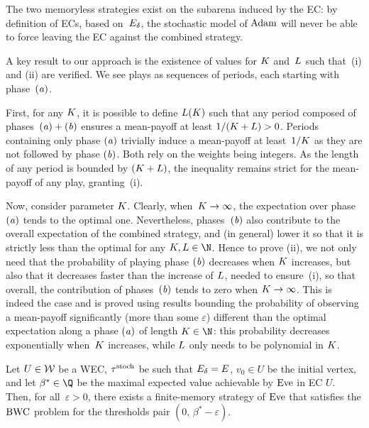 The two memoryless strategies exist on the subarena induced by the EC: by definition of ECs, based on~$E_{\delta}$, the stochastic model of $\text{Adam}$ will never be able to force leaving the EC against the combined strategy.

A key result to our approach is the existence of values for $K$ and~$L$ such that~(i) and (ii) are verified. We see plays as sequences of periods, each starting with phase~$\mathit{(a)}$.

First, for any $K$, it is possible to define $L(K)$ such that any period composed of phases~$\mathit{(a)}+\mathit{(b)}$ ensures a mean-payoff at least $1/(K+L) > 0$. Periods containing only phase $\mathit{(a)}$ trivially induce a mean-payoff at least~$1/K$ as they are not followed by phase $\mathit{(b)}$. Both rely on the weights being integers. As the length of any period is bounded by $(K+L)$, the inequality remains strict for the mean-payoff of any play, granting~(i).

Now, consider parameter $K$. Clearly, when~$K \rightarrow \infty$, the expectation over phase $\mathit{(a)}$ tends to the optimal one. Nevertheless, phases~$\mathit{(b)}$ also contribute to the overall expectation of the combined strategy, and (in general) lower it so that it is strictly less than the optimal for any $\stepsExp, \stepsWC \in \N$. Hence to prove (ii), we not only need that the probability of playing phase $\mathit{(b)}$ decreases when $K$ increases, but also that it decreases faster than the increase of $L$, needed to ensure~(i), so that overall, the contribution of phases~$\mathit{(b)}$ tends to zero when $K \rightarrow \infty$. This is indeed the case and is proved using results bounding the probability of observing a mean-payoff significantly (more than some $\varepsilon$) different than the optimal expectation along a phase $\mathit{(a)}$ of length $\stepsExp \in \N$: this probability decreases exponentially when~$K$ increases, while $L$ only needs to be polynomial in $K$.

\begin{theorem}
\label{12-thm:insideWinning}
Let $U \in \mathcal{W}$ be a WEC, $\tau^{\text{stoch}}$ be such that $E_{\delta} = E$, $v_0 \in U$ be the initial vertex, and let $\beta^\ast \in \Q$ be the maximal expected value achievable by $\text{Eve}$ in EC $U$. Then, for all~$\varepsilon > 0$, there exists a finite-memory strategy of $\text{Eve}$ that satisfies the $\text{BWC}$ problem for the thresholds pair $(0,\, \beta^\ast - \varepsilon)$.
\end{theorem}

